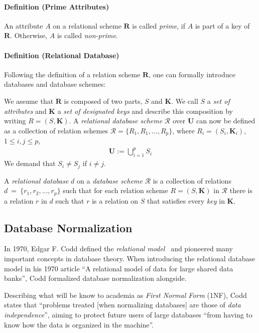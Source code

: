 \paragraph{Definition (Prime Attributes)} An attribute \( A \) on a relational scheme \( \boldsymbol{R} \) is called \emph{prime}, if \( A \) is part of a key of \( \boldsymbol{R} \).
Otherwise, \( A \) is called \emph{non-prime}.

\paragraph{Definition (Relational Database)}
Following the definition of a relation scheme \( \boldsymbol{R} \), one can formally introduce databases and database schemes:

We assume that \( \boldsymbol{R}\) is composed of two parts, \(S\) and \(\boldsymbol{K}\). We call \(S\) a \emph{set of attributes} and \(\boldsymbol{K}\) a \emph{set of designated keys} and describe this composition by writing \(R = (S, \boldsymbol{K})\).
A \emph{relational database scheme} \( \mathcal{R} \) over \( \boldsymbol{U} \) can now be defined as a collection of relation schemes \( \mathcal{R} = \{R_1, R_1, \dots, R_p\} \), where \(R_i = (S_i, \boldsymbol{K}_i)\), \(1 \leq i, j \leq p\),
\begin{align*}
    \boldsymbol{U} := \bigcup^{p}_{i=1} S_i
\end{align*}
We demand that \(S_i \neq S_j\) if \(i \neq j\).

A \emph{relational database} \( d \) on a \emph{database scheme} \( \mathcal{R} \) is a collection of relations \( d~=~\{r_1, r_2, \dots, r_p \} \) such that for each relation scheme \(R = (S, \boldsymbol{K}) \) in \( \mathcal{R} \) there is a relation \(r\) in \(d\) such that \(r\) is a relation on \(S\) that satisfies every \emph{key} in \(\boldsymbol{K}\).~\cite[p.~94]{MAI83}


\subsection{Database Normalization}
In 1970, Edgar F. Codd defined the \emph{relational model}~\cite{COD70} and pioneered many important concepts in database theory.
When introducing the relational database model in his 1970 article ``A relational model of data for large shared data banks'', Codd formalized database normalization alongside.~\cite{COD70}

Describing what will be know to academia as \emph{First Normal Form} (1NF), Codd states that ``problems treated [when normalizing databases] are those of \emph{data independence}'', aiming to protect future users of large databases ``from having to know how the data is organized in the machine''.~\cite[p.~1]{COD70}

